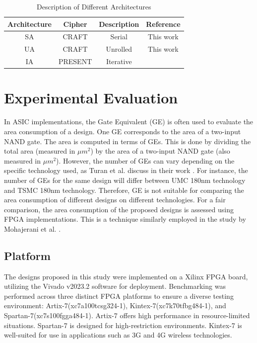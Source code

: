 \documentclass[final,5p,times,twocolumn]{elsarticle}
\begin{document}
\begin{table}[h]
    \centering
    \caption{Description of Different Architectures}\label{tab2}%
    \begin{tabular}{|c|c|c|c|}
        \hline
        Architecture & Cipher  & Description & Reference           \\
        \hline
        SA           & CRAFT   & Serial      & This work           \\
        UA           & CRAFT   & Unrolled    & This work           \\
        IA           & PRESENT & Iterative   & \cite{Bharathi2022} \\
        \hline
    \end{tabular}
\end{table}


\section{Experimental Evaluation}\label{sec4}

In ASIC implementations, the Gate Equivalent (GE) is often used to evaluate the area consumption of a design.
One GE corresponds to the area of a two-input NAND gate. 
The area is computed in terms of GEs. 
This is done by dividing the total area (measured in $\mu m^2$) by the area of a two-input NAND gate (also measured in $\mu m^2$).
However, the number of GEs can vary depending on the specific technology used, as Turan et al. discuss in their work \cite{Turan}.
For instance, the number of GEs for the same design will differ between UMC 180nm technology and TSMC 180nm technology.
Therefore, GE is not suitable for comparing the area consumption of different designs on different technologies.
For a fair comparison, the area consumption of the proposed designs is assessed using FPGA implementations.
This is a technique similarly employed in the study by Mohajerani et al. \cite{Mohajerani2020}.

\subsection{Platform}\label{subsec4}

The designs proposed in this study were implemented on a Xilinx FPGA board, utilizing the Vivado v2023.2 software for deployment.
Benchmarking was performed across three distinct FPGA platforms to ensure a diverse testing environment: Artix-7(xc7a100tcsg324-1), Kintex-7(xc7k70tfbg484-1), and Spartan-7(xc7s100fgga484-1).
Artix-7 offers high performance in resource-limited situations. Spartan-7 is designed for high-restriction environments. Kintex-7 is well-suited for use in applications such as 3G and 4G wireless technologies.
\end{document}
